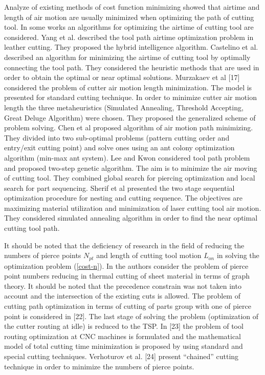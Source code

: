 \documentclass[runningheads]{llncs}
\begin{document}
Analyze of existing methods of cost function minimizing showed that
airtime and length of air motion are usually minimized when optimizing the path of cutting tool.
In some works an algorithms for optimizing the airtime of cutting tool are considered.
Yang et al. \cite{Yang2010}
described the tool path airtime optimization problem in leather cutting.
They proposed the hybrid intelligence algorithm.
Castelino et al. \cite{d2003tool}
described an algorithm for minimizing the airtime of cutting tool
by optimally connecting the tool path.
They considered the heuristic methods that are used
in order to obtain the optimal or near optimal solutions.
Murzakaev et al [17] considered the problem of cutter air motion length minimization.
The model is presented for standard cutting technique.
In order to minimize cutter air motion length the three metaheuristics
(Simulated Annealing, Threshold Accepting, Great Deluge Algorithm) were chosen.
They proposed the generalized scheme of problem solving.
Chen et al \cite{Chen2014Dec}
proposed algorithm of air motion path minimizing.
They divided into two sub-optimal problems
(pattern cutting order and entry/exit cutting point)
and solve ones using an ant colony optimization algorithm (min-max ant system).
Lee and Kwon \cite{Lee2006Dec}
considered tool path problem and proposed two-step genetic algorithm.
The aim is to minimize the air moving of cutting tool.
They combined global search for piercing optimization and local search for part sequencing.
Sherif et al \cite{Sherif2014Oct}
presented the two stage sequential optimization procedure for nesting and cutting sequence.
The objectives are maximizing material utilization and minimization of laser cutting tool air motion.
They considered simulated annealing algorithm in order to find the near optimal cutting tool path.

It should be noted that
the deficiency of research in the field of reducing the numbers of pierce points $N_{pt}$
and length of cutting tool motion  $L_{on}$
in solving the optimization problem (\ref{cost-n}).
In \cite{Manber1984Jan}
the authors consider the problem of pierce point numbers reducing
in thermal cutting of sheet material in terms of graph theory.
It should be noted that the precedence constrain was not taken into account
and the intersection of the existing cuts is allowed.
The problem of cutting path optimization in terms of cutting of parts group
with one of pierce point is considered in [22].
The last stage of solving the problem
(optimization of the cutter routing at idle)
is reduced to the TSP.
In [23] the problem of tool routing optimization at CNC machines is formulated
and the mathematical model of total cutting time minimization is proposed
by using standard and special cutting techniques.
Verhoturov et al. [24] present ``chained'' cutting technique
in order to minimize the numbers of pierce points.
\end{document}
